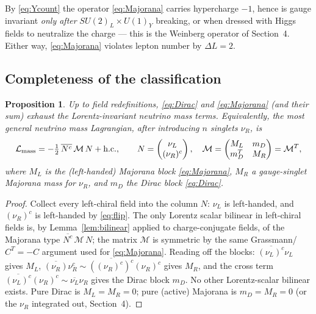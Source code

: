 \documentclass[12pt]{article}
\newtheorem{proposition}{Proposition}
\theoremstyle{definition}
\newcommand{\nuL}{\nu_L}
\newcommand{\nuR}{\nu_R}
\begin{document}
By \eqref{eq:Ycount} the operator \eqref{eq:Majorana} carries
hypercharge $-1$, hence is gauge invariant \emph{only after}
$SU(2)_L\times U(1)_Y$ breaking, or when dressed with Higgs fields to
neutralize the charge --- this is the Weinberg operator of Section~4.
Either way, \eqref{eq:Majorana} violates lepton number by
$\Delta L=2$.

\subsection{Completeness of the classification}
\begin{proposition}\label{prop:exhaust}
Up to field redefinitions, \eqref{eq:Dirac} and \eqref{eq:Majorana} (and
their sum) exhaust the Lorentz-invariant neutrino mass terms. Equivalently,
the most general neutrino mass Lagrangian, after introducing $n$ singlets
$\nuR$, is
\begin{equation}\label{eq:general}
\mathcal L_{\rm mass}
=-\tfrac12\,\overline{N^c}\,\mathcal M\,N+\text{h.c.},\qquad
N=\begin{pmatrix}\nuL\\ (\nuR)^c\end{pmatrix},\quad
\mathcal M=\begin{pmatrix}M_L & m_D\\ m_D^T & M_R\end{pmatrix}
=\mathcal M^T,
\end{equation}
where $M_L$ is the (left-handed) Majorana block \eqref{eq:Majorana},
$M_R$ a gauge-singlet Majorana mass for $\nuR$, and $m_D$ the Dirac block
\eqref{eq:Dirac}.
\end{proposition}
\begin{proof}
Collect every left-chiral field into the column $N$: $\nuL$ is
left-handed, and $(\nuR)^c$ is left-handed by \eqref{eq:flip}. The only
Lorentz scalar bilinear in left-chiral fields is, by Lemma~\ref{lem:bilinear}
applied to charge-conjugate fields, of the Majorana type
$\overline{N^c}\,\mathcal M\,N$; the matrix $\mathcal M$ is symmetric by
the same Grassmann/$C^T=-C$ argument used for \eqref{eq:Majorana}. Reading
off the blocks: $\overline{(\nuL)^c}\nuL$ gives $M_L$,
$\overline{(\nuR)}\nuR^c\sim\overline{((\nuR)^c)^c}(\nuR)^c$ gives $M_R$,
and the cross term $\overline{(\nuL)^c}(\nuR)^c\sim\overline{\nuL}\nuR$
gives the Dirac block $m_D$. No other Lorentz-scalar bilinear exists.
Pure Dirac is $M_L=M_R=0$; pure (active) Majorana is $m_D=M_R=0$ (or the
$\nuR$ integrated out, Section~4).
\end{proof}
\end{document}
